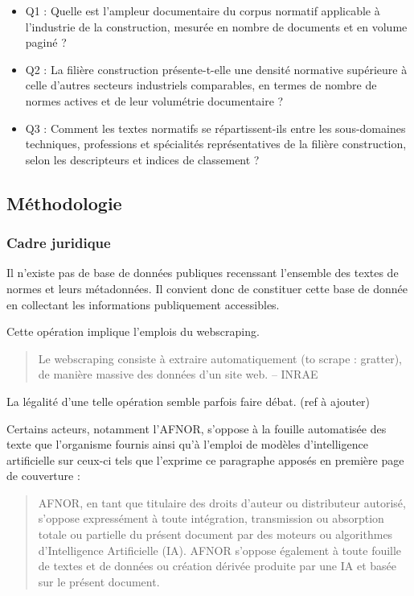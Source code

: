 \documentclass[a4paper,12pt]{article}
\begin{document}
\begin{itemize}
\item Q1 : Quelle est l’ampleur documentaire du corpus normatif applicable à l’industrie de la construction, mesurée en nombre de documents et en volume paginé ?
\item Q2 : La filière construction présente-t-elle une densité normative supérieure à celle d’autres secteurs industriels comparables, en termes de nombre de normes actives et de leur volumétrie documentaire ?
\item Q3 : Comment les textes normatifs se répartissent-ils entre les sous-domaines techniques, professions et spécialités représentatives de la filière construction, selon les descripteurs et indices de classement ?
\end{itemize}
\subsection{Méthodologie}
\label{sec:orgb285068}
\subsubsection{Cadre juridique}
\label{sec:orga1fd340}
Il n'existe pas de base de données publiques recenssant l'ensemble des textes de normes et leurs métadonnées. Il convient donc de constituer cette base de donnée en collectant les informations publiquement accessibles.

Cette opération implique l'emplois du webscraping.

\begin{quote}
Le webscraping consiste à extraire automatiquement (to scrape : gratter), de manière massive des données d'un site web. -- INRAE\autocite{quesnevilleRecommandationsUsagesWebscraping2024}
\end{quote}

La légalité d'une telle opération semble parfois faire débat. (ref à ajouter)

Certains acteurs, notamment l'AFNOR, s'oppose à la fouille automatisée des texte que l'organisme fournis ainsi qu'à l'emploi de modèles d'intelligence artificielle sur ceux-ci tels que l'exprime ce paragraphe apposés en première page de couverture :
\begin{quote}
AFNOR, en tant que titulaire des droits d’auteur ou distributeur autorisé, s’oppose expressément à toute intégration, transmission ou absorption totale ou partielle du présent document par des moteurs ou algorithmes d’Intelligence Artificielle (IA). AFNOR s’oppose également à toute fouille de textes et de données ou création dérivée produite par une IA et basée sur le présent document.
\end{quote}
\end{document}
